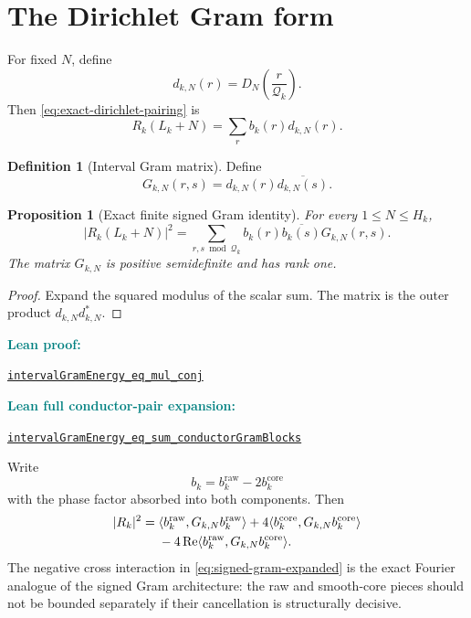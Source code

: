 \documentclass[11pt]{article}
\newtheorem{proposition}[theorem]{Proposition}
\theoremstyle{definition}
\newtheorem{definition}[theorem]{Definition}
\newcommand{\Rea}{\operatorname{Re}}
\newcommand{\leanxref}[3]{%
  \par\smallskip
  {\small\noindent\textcolor{teal}{\textbf{#1:}}\par
  \noindent\href{#3}{\nolinkurl{#2}}\par}
  \smallskip
}
\begin{document}
\section{The Dirichlet Gram form}

For fixed $N$, define
\[
d_{k,N}(r)=D_N\!\left(\frac r{\mathcal Q_k}\right).
\]
Then \eqref{eq:exact-dirichlet-pairing} is
\[
R_k(L_k+N)=\sum_r b_k(r)d_{k,N}(r).
\]

\begin{definition}[Interval Gram matrix]\label{def:gram}
Define
\[
G_{k,N}(r,s)=d_{k,N}(r)\overline{d_{k,N}(s)}.
\]
\end{definition}

\begin{proposition}[Exact finite signed Gram identity]\label{prop:gram-identity}
For every $1\le N\le H_k$,
\begin{equation}\label{eq:gram-identity}
|R_k(L_k+N)|^2
=
\sum_{r,s\bmod\mathcal Q_k}
 b_k(r)\overline{b_k(s)}G_{k,N}(r,s).
\end{equation}
The matrix $G_{k,N}$ is positive semidefinite and has rank one.
\end{proposition}

\begin{proof}
Expand the squared modulus of the scalar sum.  The matrix is the outer product $d_{k,N}d_{k,N}^{*}$.
\end{proof}
\leanxref{Lean proof}{intervalGramEnergy_eq_mul_conj}{https://github.com/OVVO-Financial/prime-wheel-mobius/blob/main/formalization/RHLean/Analysis/PrimeWheelFourierReduction.lean}
\leanxref{Lean full conductor-pair expansion}{intervalGramEnergy_eq_sum_conductorGramBlocks}{https://github.com/OVVO-Financial/prime-wheel-mobius/blob/main/formalization/RHLean/Analysis/PrimeWheelConductorGram.lean}

Write
\[
b_k=b_k^{\mathrm{raw}}-2b_k^{\mathrm{core}}
\]
with the phase factor absorbed into both components.  Then
\begin{align}
|R_k|^2
={}&\langle b_k^{\mathrm{raw}},G_{k,N}b_k^{\mathrm{raw}}\rangle
+4\langle b_k^{\mathrm{core}},G_{k,N}b_k^{\mathrm{core}}\rangle\notag\\
&-4\Rea\langle b_k^{\mathrm{raw}},G_{k,N}b_k^{\mathrm{core}}\rangle.
\label{eq:signed-gram-expanded}
\end{align}
The negative cross interaction in \eqref{eq:signed-gram-expanded} is the exact Fourier analogue of the signed Gram architecture: the raw and smooth-core pieces should not be bounded separately if their cancellation is structurally decisive.
\end{document}
